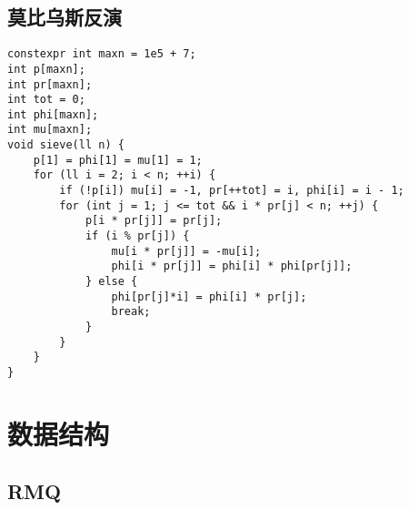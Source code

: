 \documentclass[a4paper,10pt]{article}
\begin{document}
\subsection{莫比乌斯反演}
\thispagestyle{fancy}

\noindent\begin{lstlisting}
constexpr int maxn = 1e5 + 7;
int p[maxn];
int pr[maxn];
int tot = 0;
int phi[maxn];
int mu[maxn];
void sieve(ll n) {
    p[1] = phi[1] = mu[1] = 1;
    for (ll i = 2; i < n; ++i) {
        if (!p[i]) mu[i] = -1, pr[++tot] = i, phi[i] = i - 1;
        for (int j = 1; j <= tot && i * pr[j] < n; ++j) {
            p[i * pr[j]] = pr[j];
            if (i % pr[j]) {
                mu[i * pr[j]] = -mu[i];
                phi[i * pr[j]] = phi[i] * phi[pr[j]];
            } else {
                phi[pr[j]*i] = phi[i] * pr[j];
                break;
            }
        }
    }
}
\end{lstlisting}

\section{数据结构}
\thispagestyle{fancy}

\subsection{RMQ}
\thispagestyle{fancy}
\end{document}
